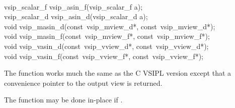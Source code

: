 \\\cvsiplh
\begin{cfuncs}
vsip\_scalar\_f vsip\_asin\_f(vsip\_scalar\_f a);\Bs\\
vsip\_scalar\_d vsip\_asin\_d(vsip\_scalar\_d a);\Bs\\
void vsip\_masin\_d(const~vsip\_mview\_d*, const~vsip\_mview\_d*);\Bs\\
void vsip\_masin\_f(const~vsip\_mview\_f*, const~vsip\_mview\_f*);\Bs\\
void vsip\_vasin\_d(const~vsip\_vview\_d*, const~vsip\_vview\_d*);\Bs\\
void vsip\_vasin\_f(const~vsip\_vview\_f*, const~vsip\_vview\_f*);\Bs\\
\end{cfuncs}
\pyjvsiph
{}
\begin{comments}
\item{The  function works much the same as the C VSIPL version except that a convenience pointer to the output view is returned. 
\item The  function may be done in-place if .}
\end{comments}
